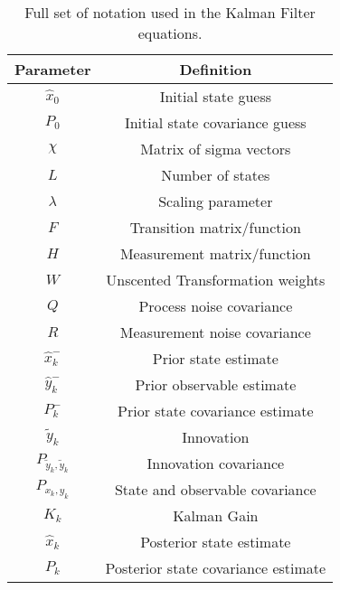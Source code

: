 \documentclass{article}
\begin{document}
\begin{table}[H]
  \begin{center}
    \label{tab:table1}
    \begin{tabular}{c|c} %
      \textbf{Parameter} & \textbf{Definition}\\
      \hline
      \textbf{$\hat{x}_0$} & Initial state guess\\
      \hline
      \textbf{$P_0$} & Initial state covariance guess\\
      \hline
      \textbf{$\chi$} & Matrix of sigma vectors\\
      \hline
      \textbf{$L$} & Number of states\\
      \hline
      \textbf{$\lambda$} & Scaling parameter\\
      \hline
      \textbf{$F$} & Transition matrix/function\\
      \hline
      \textbf{$H$} & Measurement matrix/function\\
      \hline
      \textbf{$W$} & Unscented Transformation weights\\
      \hline
      \textbf{$Q$} & Process noise covariance\\
      \hline
      \textbf{$R$} & Measurement noise covariance\\
      \hline
      \textbf{$\hat{x}_k^-$} & Prior state estimate\\
      \hline
      \textbf{$\hat{y}_k^-$} & Prior observable estimate\\
      \hline
      \textbf{$P_k^-$} & Prior state covariance estimate\\
      \hline
      \textbf{$\tilde{y}_k$} & Innovation\\
      \hline
      \textbf{$P_{\tilde{y}_k, \tilde{y}_k}$} & Innovation covariance\\
      \hline
      \textbf{$P_{x_k, y_k}$} & State and observable covariance\\
      \hline
      \textbf{$K_k$} & Kalman Gain\\
      \hline
      \textbf{$\hat{x}_k$} & Posterior state estimate\\
      \hline
      \textbf{$P_k$} & Posterior state covariance estimate
    \end{tabular}
    \caption{Full set of notation used in the Kalman Filter equations.}
    \label{table:KF_Notation}
  \end{center}
\end{table}
    
\end{document}
